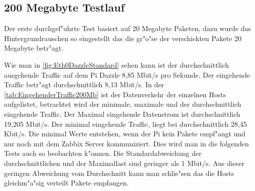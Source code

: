 \subsection{200 Megabyte Testlauf}
\label{subsec:200MBTest}
Der erste durchgef"uhrte Test basiert auf 20 Megabyte Paketen, dazu wurde das Hintergrundrauschen %
so eingestellt das die gr"o"se der verschickten Pakete 20 Megabyte betr"agt. 

Wie man in \cref{fig:Eth0DazzleStandard} sehen kann ist der durchschnittlich ausgehende Traffic auf dem Pi Dazzle 8,85 Mbit/s %
pro Sekunde. Der eingehende Traffic betr"agt durchschnittlich 8,13 Mbit/s. In der \cref{tab:EingehenderTraffic200Mb} %
ist der Datenverkehr der einzelnen Hosts aufgelistet, betrachtet wird der minimale, maximale und der durchschnittlich eingehende Traffic. %
Der Maximal eingehende Datenstrom ist durchschnittlich 19,205 Mbit/s. Der minimal eingehende Traffic, liegt bei %
durchschnittlich 28,45 Kbit/s. Die minimal Werte entstehen, wenn der Pi kein Pakete empf"angt und nur noch mit dem Zabbix Server kommuniziert. %
Dies wird man in die folgenden Tests auch so beobachten k"onnen. Die Standardabweichung der durchschnittlichen %
und der Maximallast sind geringer als 1 Mbit/s. Aus dieser geringen Abweichung vom Durchschnitt kann man schlie"sen das die Hosts %
gleichm"a"sig verteilt Pakete empfangen. %

